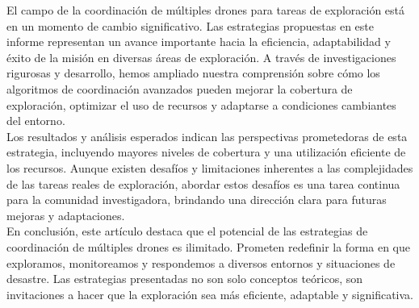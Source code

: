 \documentclass[sigconf]{acmart}
\begin{document}

El campo de la coordinación de múltiples drones para tareas de exploración está en un momento de cambio significativo. Las estrategias propuestas en este informe representan un avance importante hacia la eficiencia, adaptabilidad y éxito de la misión en diversas áreas de exploración. A través de investigaciones rigurosas y desarrollo, hemos ampliado nuestra comprensión sobre cómo los algoritmos de coordinación avanzados pueden mejorar la cobertura de exploración, optimizar el uso de recursos y adaptarse a condiciones cambiantes del entorno.\\


Los resultados y análisis esperados indican las perspectivas prometedoras de esta estrategia, incluyendo mayores niveles de cobertura y una utilización eficiente de los recursos. Aunque existen desafíos y limitaciones inherentes a las complejidades de las tareas reales de exploración, abordar estos desafíos es una tarea continua para la comunidad investigadora, brindando una dirección clara para futuras mejoras y adaptaciones.\\


En conclusión, este artículo destaca que el potencial de las estrategias de coordinación de múltiples drones es ilimitado. Prometen redefinir la forma en que exploramos, monitoreamos y respondemos a diversos entornos y situaciones de desastre. Las estrategias presentadas no son solo conceptos teóricos, son invitaciones a hacer que la exploración sea más eficiente, adaptable y significativa.\\
\end{document}
